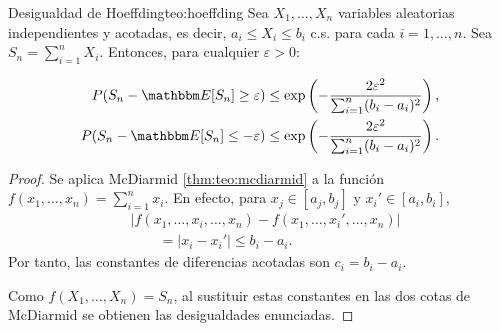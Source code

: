 \begin{theorem}{Desigualdad de Hoeffding}{teo:hoeffding}
	Sea \(X_1, \ldots, X_n\) variables aleatorias independientes y acotadas, es decir, \(a_i \leq X_i \leq b_i\) c.s. para cada \(i=1,\ldots,n\). Sea \(S_n = \sum_{i=1}^n X_i\). Entonces, para cualquier \(\varepsilon > 0\):

	\begin{align}
		P(S_n - \E{S_n} \geq \varepsilon) & \leq \exp\left( -\frac{2\varepsilon^2}{\sum_{i=1}^n (b_i - a_i)^2} \right), \\
		P(S_n - \E{S_n} \leq -\varepsilon) & \leq \exp\left( -\frac{2\varepsilon^2}{\sum_{i=1}^n (b_i - a_i)^2} \right).
	\end{align}
\end{theorem}

\begin{proof}
	Se aplica McDiarmid \ref{thm:teo:mcdiarmid} a la función \(f(x_1, \ldots, x_n) = \sum_{i=1}^n x_i\).
	En efecto, para \(x_j\in[a_j,b_j]\) y \(x_i'\in[a_i,b_i]\),
	\begin{align*}
		&\left|f(x_1,\ldots,x_i,\ldots,x_n)-f(x_1,\ldots,x_i',\ldots,x_n)\right|\\
		&\qquad=|x_i-x_i'|\leq b_i-a_i.
	\end{align*}
	Por tanto, las constantes de diferencias acotadas son \(c_i=b_i-a_i\).

	Como \(f(X_1,\ldots,X_n)=S_n\), al sustituir estas constantes en las dos cotas de McDiarmid se obtienen las desigualdades enunciadas.
\end{proof}
